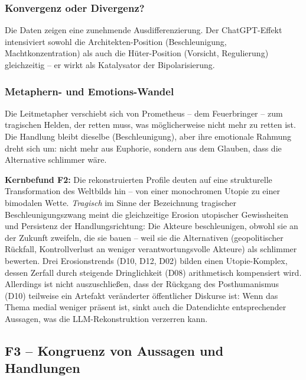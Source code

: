 \documentclass[12pt,a4paper]{article}
\begin{document}
\subsubsection{Konvergenz oder Divergenz?}

Die Daten zeigen eine zunehmende Ausdifferenzierung. Der ChatGPT-Effekt intensiviert sowohl die Architekten-Position (Beschleunigung, Machtkonzentration) als auch die H\"uter-Position (Vorsicht, Regulierung) gleichzeitig -- er wirkt als Katalysator der Bipolarisierung.


\subsubsection{Metaphern- und Emotions-Wandel}

Die Leitmetapher verschiebt sich von Prometheus -- dem Feuerbringer -- zum tragischen Helden, der retten muss, was m\"oglicherweise nicht mehr zu retten ist. Die Handlung bleibt dieselbe (Beschleunigung), aber ihre emotionale Rahmung dreht sich um: nicht mehr aus Euphorie, sondern aus dem Glauben, dass die Alternative schlimmer w\"are.

\medskip
\noindent\textbf{Kernbefund F2:} Die rekonstruierten Profile deuten auf eine strukturelle Transformation des Weltbilds hin -- von einer monochromen Utopie zu einer bimodalen Wette. \emph{Tragisch} im Sinne der Bezeichnung \glqq tragischer Beschleunigungszwang\grqq{} meint die gleichzeitige Erosion utopischer Gewissheiten und Persistenz der Handlungsrichtung: Die Akteure beschleunigen, obwohl sie an der Zukunft zweifeln, die sie bauen -- weil sie die Alternativen (geopolitischer R\"uckfall, Kontrollverlust an weniger verantwortungsvolle Akteure) als schlimmer bewerten. Drei Erosionstrends (D10, D12, D02) bilden einen \glqq Utopie-Komplex\grqq, dessen Zerfall durch steigende Dringlichkeit (D08) arithmetisch kompensiert wird. Allerdings ist nicht auszuschlie\ss{}en, dass der R\"uckgang des Posthumanismus (D10) teilweise ein Artefakt ver\"anderter \"offentlicher Diskurse ist: Wenn das Thema medial weniger pr\"asent ist, sinkt auch die Datendichte entsprechender Aussagen, was die LLM-Rekonstruktion verzerren kann.


\subsection{F3 -- Kongruenz von Aussagen und Handlungen}
\label{sec:ergebnisse:f3}
\end{document}
